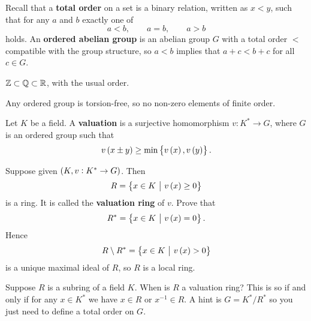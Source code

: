 Recall that a \textbf{total order} on a set is a binary relation, written as $ x < y $, such that for any $ a $ and $ b $ exactly one of
$$ a < b, \qquad a = b, \qquad a > b $$
holds. An \textbf{ordered abelian group} is an abelian group $ G $ with a total order $ < $ compatible with the group structure, so $ a < b $ implies that $ a + c < b + c $ for all $ c \in G $.

\begin{example*}
$ \mathbb{Z} \subset \mathbb{Q} \subset \mathbb{R} $, with the usual order.
\end{example*}

\begin{exercise*}
Any ordered group is torsion-free, so no non-zero elements of finite order.
\end{exercise*}

\begin{definition}
Let $ K $ be a field. A \textbf{valuation} is a surjective homomorphism $ v : K^* \to G $, where $ G $ is an ordered group such that
$$ v\br{x \pm y} \ge \min\cbr{v\br{x}, v\br{y}}. $$
\end{definition}

\begin{exercise*}
Suppose given $ \br{K, v: K^* \to G} $. Then
$$ R = \cbr{x \in K \st v\br{x} \ge 0} $$
is a ring. It is called the \textbf{valuation ring} of $ v $. Prove that
$$ R^* = \cbr{x \in K \st v\br{x} = 0}. $$
Hence
$$ R \setminus R^* = \cbr{x \in K \st v\br{x} > 0} $$
is a unique maximal ideal of $ R $, so $ R $ is a local ring.
\end{exercise*}

\pagebreak

\begin{exercise*}
Suppose $ R $ is a subring of a field $ K $. When is $ R $ a valuation ring? This is so if and only if for any $ x \in K^* $ we have $ x \in R $ or $ x^{-1} \in R $. A hint is $ G = K^* / R^* $ so you just need to define a total order on $ G $.
\end{exercise*}

